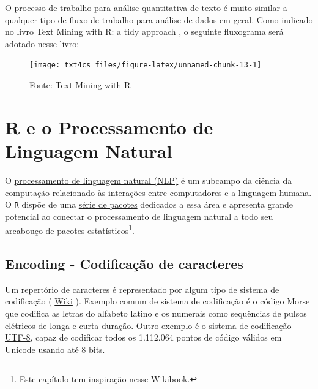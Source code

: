 \documentclass[]{book}
\begin{document}
O processo de trabalho para análise quantitativa de texto é muito similar a qualquer tipo de fluxo de trabalho para análise de dados em geral. Como indicado no livro \href{https://www.tidytextmining.com/topicmodeling.html}{Text Mining with R: a tidy approach} \citep{silge_text_2017}, o seguinte fluxograma será adotado nesse livro:

\begin{figure}

{\centering \texttt{[image: txt4cs\_files/figure-latex/unnamed-chunk-13-1]} 

}

\caption{Fonte: Text Mining with R}\label{fig:unnamed-chunk-13}
\end{figure}

\hypertarget{regex}{%
\chapter{R e o Processamento de Linguagem Natural}\label{regex}}

O \href{https://en.wikipedia.org/wiki/Natural_language_processing}{processamento de linguagem natural (NLP)} é um subcampo da ciência da computação relacionado às interações entre computadores e a linguagem humana. O \texttt{R} dispõe de uma \href{https://cran.r-project.org/web/views/NaturalLanguageProcessing.html}{série de pacotes} dedicados a essa área e apresenta grande potencial ao conectar o processamento de linguagem natural a todo seu arcabouço de pacotes estatísticos\footnote{Este capítulo tem inspiração nesse \href{https://en.wikibooks.org/wiki/R_Programming/Text_Processing}{Wikibook}.}.

\hypertarget{encoding---codificauxe7uxe3o-de-caracteres}{%
\section{Encoding - Codificação de caracteres}\label{encoding---codificauxe7uxe3o-de-caracteres}}

Um repertório de caracteres é representado por algum tipo de sistema de codificação ( \href{https://en.wikipedia.org/wiki/Character_encoding\#cite_note-1}{Wiki} ). Exemplo comum de sistema de codificação é o código Morse que codifica as letras do alfabeto latino e os numerais como sequências de pulsos elétricos de longa e curta duração. Outro exemplo é o sistema de codificação \href{https://en.wikipedia.org/wiki/UTF-8}{UTF-8}, capaz de codificar todos os 1.112.064 pontos de código válidos em Unicode usando até 8 bits.
\end{document}

